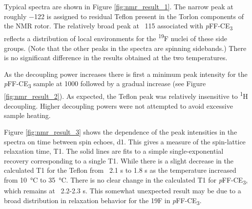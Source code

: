 \begin{refsection}
Typical spectra are shown in Figure \ref{fig:nmr_result_1}.  The narrow peak at
roughly \SI{-122}{\ppm} is assigned to residual Teflon present in the Torlon
components of the NMR rotor.  The relatively broad peak at ~\SI{115}{\ppm}
associated with \emph{p}FF-CE\textsubscript{3} reflects a distribution of local
environments for the \textsuperscript{19}F nuclei of these side groups.  (Note
that the other peaks in the spectra are spinning sidebands.) There is no
significant difference in the results obtained at the two temperatures.

As the decoupling power increases there is first a minimum peak intensity for
the \emph{p}FF-CE\textsubscript{3} sample at 1000 followed by a gradual
increase (see Figure \ref{fig:nmr_result_2}).  As expected, the Teflon peak was
relatively insensitive to \textsuperscript{1}H decoupling.  Higher decoupling
powers were not attempted to avoid excessive sample heating.

Figure \ref{fig:nmr_result_3} shows the dependence of the peak intensities in
the  spectra on time between spin echoes, d1.  This gives a measure
of the spin-lattice relaxation time, T1.  The solid lines are fits to a simple
single-exponential recovery corresponding to a single T1.  While there is a
slight decrease in the calculated T1 for the Teflon from ~2.1 s to 1.8 s as the
temperature increased from \SI{10}{\celsius} to \SI{35}{\celsius}.  There is no
clear change in the calculated T1 for \emph{p}FF-CE\textsubscript{3}, which
remains at ~2.2-2.3 s.  This somewhat unexpected result may be due to a broad
distribution in relaxation behavior for the 19F in
\emph{p}FF-CE\textsubscript{3}.


\end{refsection}
